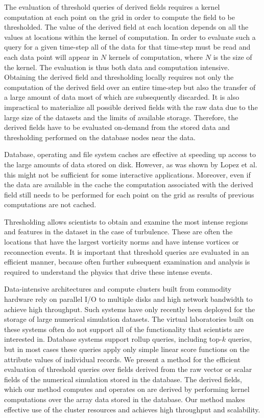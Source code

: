 \documentclass{sig-alternate}
\begin{document}
The evaluation of threshold queries of derived fields requires a kernel computation at each point on the grid in order to compute the field to be thresholded.
The value of the derived field at each location depends on all the values at locations within the kernel of computation. 
In order to evaluate such a query for a given time-step all of the data for that time-step must be read and each data point 
will appear in $N$ kernels of computation, where $N$ is the size of the kernel. The evaluation is thus both data and computation intensive.
Obtaining the derived field and thresholding locally requires not only the computation of the derived field over an entire time-step but also the transfer of
a large amount of data most of which are subsequently discarded. 
It is also impractical to materialize all possible derived fields with the raw data
due to the large size of the datasets and the limits of available storage. Therefore, the derived fields 
have to be evaluated on-demand from the stored data and thresholding performed on the database nodes near the data.

Database, operating and file system caches are effective at speeding up access to the large amounts of data stored on disk. However, as was
shown by Lopez et al. \cite{Lopez} this might not be sufficient for some interactive applications. Moreover, even if the data are available in the cache the
computation associated with the derived field still needs to be performed for each point on the grid as results of previous computations are not cached. 

Thresholding allows scientists to obtain and examine the most intense regions and features in the dataset in the case of turbulence. 
These are often the locations that have the largest vorticity norms and have intense vortices or reconnection events. 
It is important that threshold queries are evaluated in an efficient manner, because often further subsequent examination
and analysis is required to understand the physics that drive these intense events. 

Data-intensive architectures and compute clusters built from commodity hardware rely on parallel I/O to multiple disks and high network bandwidth
to achieve high throughput. Such systems have only recently been deployed for the storage of large numerical simulation 
datasets. The virtual laboratories built on these systems often do not support
all of the functionality that scientists are interested in. Database systems support rollup queries, including top-$k$ queries, but in most cases these
queries apply only simple linear score functions on the attribute values of individual records. 
We present a method for the efficient evaluation of threshold queries over fields derived from the raw vector or scalar fields of the numerical simulation 
stored in the database. The derived fields, which our method computes and operates on are derived by performing kernel computations over the array data 
stored in the database.
Our method makes effective use of the cluster resources and achieves high throughput and scalability. 
\end{document}
